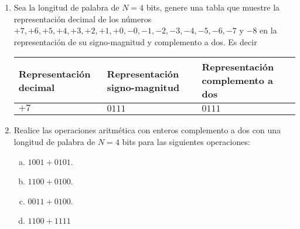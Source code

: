 \documentclass{beamer}
\newcounter{savedenum}
\newcommand*{\saveenum}{\setcounter{savedenum}{\theenumi}}
\newcommand*{\resume}{\setcounter{enumi}{\thesavedenum}}
\begin{document}
\begin{frame}
	\begin{enumerate}
		\resume
		\item Sea la longitud de palabra de $N=4$ bits, genere una tabla que muestre la representación decimal de los números $+7,+6,+5,+4,+3,+2,+1,+0,-0,-1,-2,-3,-4,-5,-6,-7$ y $-8$ en la representación de su signo-magnitud y complemento a dos. Es decir
		      \begin{table}[ht!]
			      \centering
			      \begin{tabular}{|x{2.5cm}|x{2.5cm}|x{3.1cm}|}
				      \hline
				      Representación decimal & Representación signo-magnitud & Representación complemento a dos \\
				      \hline$+7$             & $0111$                        & $0111$                           \\
				      \hline
			      \end{tabular}
		      \end{table}
		\item Realice las operaciones aritmética con enteros complemento a dos con una longitud de palabra de $N=4$ bits para las siguientes operaciones:
		      \begin{multicols}{2}
			      \begin{enumerate}[a)]
				      \item $1001+0101$.
				      \item $1100+0100$.
				      \item $0011+0100$.
				      \item $1100+1111$
			      \end{enumerate}
		      \end{multicols}
		      \saveenum
	\end{enumerate}
\end{frame}
\end{document}
